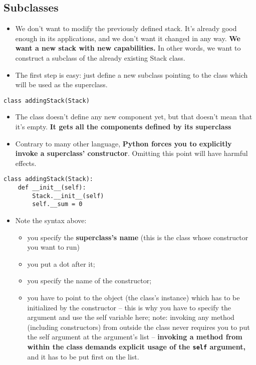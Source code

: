 \documentclass[11pt]{article}
\begin{document}
\newpage
\subsection{Subclasses}
\label{sec:org8d0fb63}
\begin{itemize}
\item We don’t want to modify the previously defined stack. It’s already
good enough in its applications, and we don’t want it changed in any
way. \textbf{We want a new stack with new capabilities.} In other words, we
want to construct a subclass of the already existing Stack class.
\item The first step is easy: just define a new subclass pointing to the
class which will be used as the superclass.
\end{itemize}

\texttt{class addingStack(Stack)}

\begin{itemize}
\item The class doesn’t define any new component yet, but that doesn’t
mean that it’s empty. \textbf{It gets all the components defined by its
superclass}

\item Contrary to many other language, \textbf{Python forces you to explicitly
invoke a superclass’ constructor}. Omitting this point will have
harmful effects.
\end{itemize}

\begin{verbatim}
class addingStack(Stack):
    def __init__(self):
        Stack.__init__(self)
        self.__sum = 0 
\end{verbatim}

\begin{itemize}
\item Note the syntax above:
\begin{itemize}
\item you specify the \textbf{superclass’s name} (this is the class whose
constructor you want to run)
\item you put a dot after it;
\item you specify the name of the constructor;
\item you have to point to the object (the class’s instance) which has
to be initialized by the constructor – this is why you have to
specify the argument and use the self variable here; note:
invoking any method (including constructors) from outside the
class never requires you to put the self argument at the
argument’s list – \textbf{invoking a method from within the class demands
explicit usage of the \texttt{self} argument,} and it has to be put first
on the list.
\end{itemize}
\end{itemize}
\end{document}
